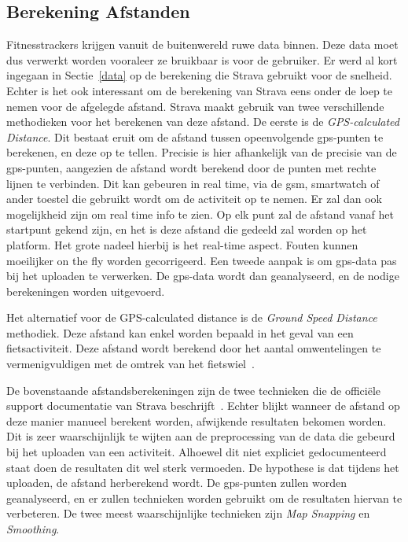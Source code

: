 \subsection{Berekening Afstanden}\label{sec:afstandsberekeningen_strava}
Fitnesstrackers krijgen vanuit de buitenwereld ruwe data binnen. Deze data moet
dus verwerkt worden vooraleer ze bruikbaar is voor de gebruiker. Er werd al
kort ingegaan in Sectie~\ref{data} op de berekening die Strava gebruikt voor de
snelheid. Echter is het ook interessant om de berekening van Strava eens onder
de loep te nemen voor de afgelegde afstand. Strava maakt gebruik van twee
verschillende methodieken voor het berekenen van deze afstand. De eerste is de
\textit{GPS-calculated Distance}. Dit bestaat eruit om de afstand tussen
opeenvolgende \ac{gps}-punten te berekenen, en deze op te tellen. Precisie is
hier afhankelijk van de precisie van de \ac{gps}-punten, aangezien de afstand
wordt berekend door de punten met rechte lijnen te verbinden. Dit kan gebeuren
in real time, via de gsm, smartwatch of ander toestel die gebruikt wordt om de
activiteit op te nemen. Er zal dan ook mogelijkheid zijn om real time info te
zien. Op elk punt zal de afstand vanaf het startpunt gekend zijn, en het is
deze afstand die gedeeld zal worden op het platform. Het grote nadeel hierbij
is het real-time aspect. Fouten kunnen moeilijker on the fly worden
gecorrigeerd. Een tweede aanpak is om \ac{gps}-data pas bij het uploaden te
verwerken. De \ac{gps}-data wordt dan geanalyseerd, en de nodige berekeningen
worden uitgevoerd.

Het alternatief voor de GPS-calculated distance is de \textit{Ground Speed
    Distance} methodiek. Deze afstand kan enkel worden bepaald in het geval van een
fietsactiviteit. Deze afstand wordt berekend door het aantal omwentelingen te
vermenigvuldigen met de omtrek van het fietswiel~\cite{HowDista47:online}.

De bovenstaande afstandsberekeningen zijn de twee technieken die de officiële
support documentatie van Strava beschrijft~\cite{HowDista47:online}. Echter
blijkt wanneer de afstand op deze manier manueel berekent worden, afwijkende
resultaten bekomen worden. Dit is zeer waarschijnlijk te wijten aan de
preprocessing van de data die gebeurd bij het uploaden van een activiteit.
Alhoewel dit niet expliciet gedocumenteerd staat doen de resultaten dit wel
sterk vermoeden. De hypothese is dat tijdens het uploaden, de afstand
herberekend wordt. De \ac{gps}-punten zullen worden geanalyseerd, en er zullen
technieken worden gebruikt om de resultaten hiervan te verbeteren. De twee
meest waarschijnlijke technieken zijn \textit{Map Snapping} en
\textit{Smoothing}.

